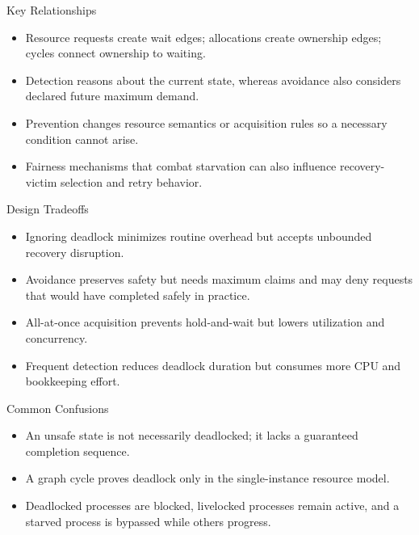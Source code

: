 \documentclass[10pt,letterpaper]{article}
\begin{document}
\begin{studybox}{Key Relationships}
\begin{itemize}
  \item Resource requests create wait edges; allocations create ownership edges; cycles connect ownership to waiting.
  \item Detection reasons about the current state, whereas avoidance also considers declared future maximum demand.
  \item Prevention changes resource semantics or acquisition rules so a necessary condition cannot arise.
  \item Fairness mechanisms that combat starvation can also influence recovery-victim selection and retry behavior.
\end{itemize}
\end{studybox}

\begin{studybox}{Design Tradeoffs}
\begin{itemize}
  \item Ignoring deadlock minimizes routine overhead but accepts unbounded recovery disruption.
  \item Avoidance preserves safety but needs maximum claims and may deny requests that would have completed safely in practice.
  \item All-at-once acquisition prevents hold-and-wait but lowers utilization and concurrency.
  \item Frequent detection reduces deadlock duration but consumes more CPU and bookkeeping effort.
\end{itemize}
\end{studybox}

\begin{studybox}{Common Confusions}
\begin{itemize}
  \item An unsafe state is not necessarily deadlocked; it lacks a guaranteed completion sequence.
  \item A graph cycle proves deadlock only in the single-instance resource model.
  \item Deadlocked processes are blocked, livelocked processes remain active, and a starved process is bypassed while others progress.
\end{itemize}
\end{studybox}
\end{document}
